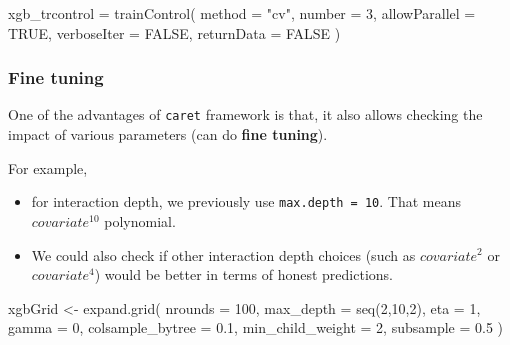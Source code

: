 \documentclass[
]{book}
\newenvironment{Shaded}{\begin{snugshade}}{\end{snugshade}}
\newcommand{\AttributeTok}[1]{\textcolor[rgb]{0.77,0.63,0.00}{#1}}
\newcommand{\ConstantTok}[1]{\textcolor[rgb]{0.00,0.00,0.00}{#1}}
\newcommand{\DecValTok}[1]{\textcolor[rgb]{0.00,0.00,0.81}{#1}}
\newcommand{\FloatTok}[1]{\textcolor[rgb]{0.00,0.00,0.81}{#1}}
\newcommand{\FunctionTok}[1]{\textcolor[rgb]{0.00,0.00,0.00}{#1}}
\newcommand{\NormalTok}[1]{#1}
\newcommand{\OtherTok}[1]{\textcolor[rgb]{0.56,0.35,0.01}{#1}}
\newcommand{\StringTok}[1]{\textcolor[rgb]{0.31,0.60,0.02}{#1}}
\providecommand{\tightlist}{%
  \setlength{\itemsep}{0pt}\setlength{\parskip}{0pt}}
\begin{document}
\begin{Shaded}
\begin{Highlighting}[]
\NormalTok{xgb\_trcontrol }\OtherTok{=} \FunctionTok{trainControl}\NormalTok{(}
  \AttributeTok{method =} \StringTok{"cv"}\NormalTok{,}
  \AttributeTok{number =} \DecValTok{3}\NormalTok{,  }
  \AttributeTok{allowParallel =} \ConstantTok{TRUE}\NormalTok{,}
  \AttributeTok{verboseIter =} \ConstantTok{FALSE}\NormalTok{,}
  \AttributeTok{returnData =} \ConstantTok{FALSE}
\NormalTok{)}
\end{Highlighting}
\end{Shaded}

\hypertarget{fine-tuning}{%
\subsubsection{Fine tuning}\label{fine-tuning}}

\begin{rmdcomment}
One of the advantages of \texttt{caret} framework is that, it also
allows checking the impact of various parameters (can do \textbf{fine
tuning}).
\end{rmdcomment}

For example,

\begin{itemize}
\tightlist
\item
  for interaction depth, we previously use \texttt{max.depth\ =\ 10}. That means \(covariate^{10}\) polynomial.
\item
  We could also check if other interaction depth choices (such as \(covariate^{2}\) or \(covariate^{4}\)) would be better in terms of honest predictions.
\end{itemize}

\begin{Shaded}
\begin{Highlighting}[]
\NormalTok{xgbGrid }\OtherTok{\textless{}{-}} \FunctionTok{expand.grid}\NormalTok{(}
  \AttributeTok{nrounds =} \DecValTok{100}\NormalTok{, }
  \AttributeTok{max\_depth =} \FunctionTok{seq}\NormalTok{(}\DecValTok{2}\NormalTok{,}\DecValTok{10}\NormalTok{,}\DecValTok{2}\NormalTok{),}
  \AttributeTok{eta =} \DecValTok{1}\NormalTok{,}
  \AttributeTok{gamma =} \DecValTok{0}\NormalTok{,}
  \AttributeTok{colsample\_bytree =} \FloatTok{0.1}\NormalTok{,}
  \AttributeTok{min\_child\_weight =} \DecValTok{2}\NormalTok{,}
  \AttributeTok{subsample =} \FloatTok{0.5} 
\NormalTok{)}
\end{Highlighting}
\end{Shaded}
\end{document}
